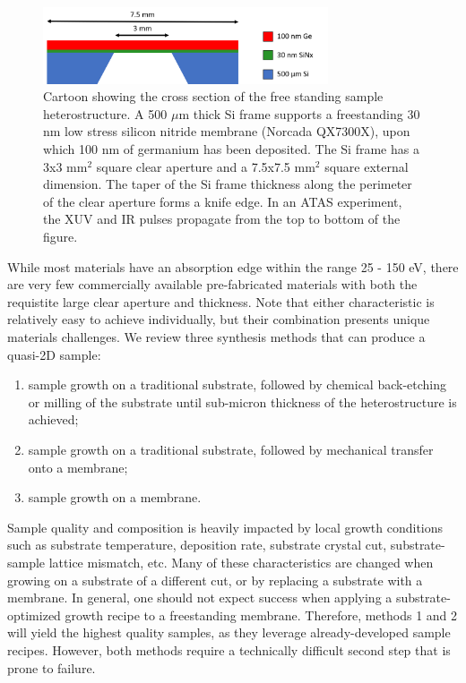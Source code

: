 \begin{figure}
	\centering
	\includegraphics[width=0.75\textwidth]{figures/chap3/Sample_Geometry.png}
	\caption{Cartoon showing the cross section of the free standing sample heterostructure. A 500 $\mu$m thick Si frame supports a freestanding 30 nm low stress silicon nitride membrane (Norcada QX7300X), upon which 100 nm of germanium has been deposited. The Si frame has a 3x3 mm$^2$ square clear aperture and a 7.5x7.5 mm$^2$ square external dimension. The taper of the Si frame thickness along the perimeter of the clear aperture forms a knife edge. In an ATAS experiment, the XUV and IR pulses propagate from the top to bottom of the figure.}
	\label{fig:Sample_Geometry}
\end{figure}

While most materials have an absorption edge within the range 25 - 150 eV, there are very few commercially available pre-fabricated materials with both the requistite large clear aperture and thickness. Note that either characteristic is relatively easy to achieve individually, but their combination presents unique materials challenges. We review three synthesis methods that can produce a quasi-2D sample:
\begin{enumerate}
	\item sample growth on a traditional substrate, followed by chemical back-etching or milling of the substrate until sub-micron thickness of the heterostructure is achieved;
	\item sample growth on a traditional substrate, followed by mechanical transfer onto a membrane;
	\item sample growth on a membrane.
\end{enumerate}
Sample quality and composition is heavily impacted by local growth conditions such as substrate temperature, deposition rate, substrate crystal cut, substrate-sample lattice mismatch, etc. Many of these characteristics are changed when growing on a substrate of a different cut, or by replacing a substrate with a membrane. In general, one should not expect success when applying a substrate-optimized growth recipe to a freestanding membrane. Therefore, methods 1 and 2 will yield the highest quality samples, as they leverage already-developed sample recipes. However, both methods require a technically difficult second step that is prone to failure.

